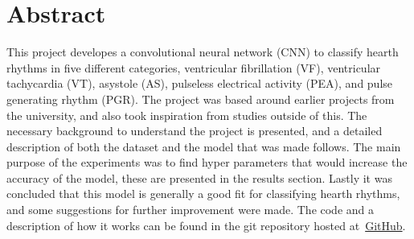\section*{Abstract}
This project developes a convolutional neural network (CNN) to classify hearth rhythms in five different categories, ventricular fibrillation (VF), ventricular tachycardia (VT), asystole (AS), pulseless electrical activity (PEA), and pulse generating rhythm (PGR). The project was based around earlier projects from the university, and also took inspiration from studies outside of this. The necessary background to understand the project is presented, and a detailed description of both the dataset and the model that was made follows. The main purpose of the experiments was to find hyper parameters that would increase the accuracy of the model, these are presented in the results section. Lastly it was concluded that this model is generally a good fit for classifying hearth rhythms, and some suggestions for further improvement were made. The code and a description of how it works can be found in the git repository hosted at~\href{https://github.com/halli2/heart_rythm_interpretation}{GitHub}.

